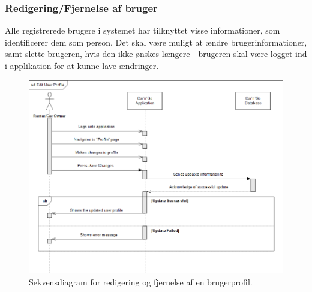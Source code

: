 \documentclass[Arkitektur/System_main.tex]{subfiles}
\begin{document}
\subsubsection{Redigering/Fjernelse af bruger}
Alle registrerede brugere i systemet har tilknyttet visse informationer, som identificerer dem som person. Det skal være muligt at ændre brugerinformationer, samt slette brugeren, hvis den ikke ønskes længere - brugeren skal være logget ind i applikation for at kunne lave ændringer. 
\begin{figure}[H]
    \centering
    \includegraphics[width=1\textwidth]{Arkitektur/Softwarearkitektur/Edit_user_profile/graphics/SystemSD_ProfilerSD.png}
    \caption{Sekvensdiagram for redigering og fjernelse af en brugerprofil. }
    \label{fig:EditUserSD}
\end{figure}
\end{document}
